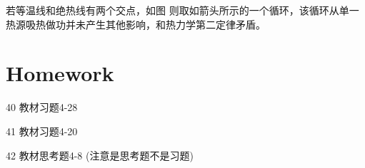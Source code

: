 \documentclass[CJK]{beamer}
\begin{document}
\begin{frame}
\bch
若等温线和绝热线有两个交点，如图
则取如箭头所示的一个循环，该循环从单一热源吸热做功并未产生其他影响，和热力学第二定律矛盾。

\ech
\end{frame}


\section{Homework}

\begin{frame}
  \bch
  {\small 
    \bitem
\item[40]{教材习题4-28}
\item[41]{教材习题4-20}
\item[42]{教材思考题4-8 (注意是思考题不是习题)}
  \eitem
  }
  \ech
\end{frame}
\end{document}
